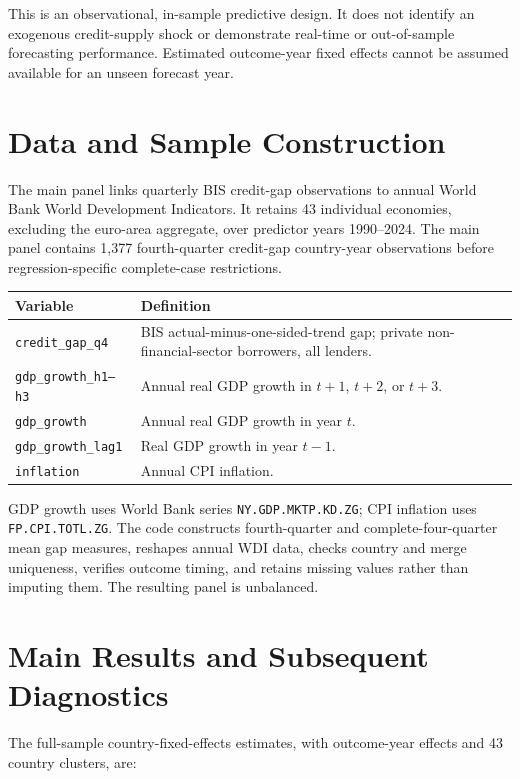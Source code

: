 \documentclass[10pt]{article}
\begin{document}
This is an observational, in-sample predictive design. It does not identify an exogenous credit-supply shock or demonstrate real-time or out-of-sample forecasting performance. Estimated outcome-year fixed effects cannot be assumed available for an unseen forecast year.

\section{Data and Sample Construction}
The main panel links quarterly BIS credit-gap observations to annual World Bank World Development Indicators. It retains 43 individual economies, excluding the euro-area aggregate, over predictor years 1990--2024. The main panel contains 1,377 fourth-quarter credit-gap country-year observations before regression-specific complete-case restrictions.

\begin{center}
\small
\begin{tabularx}{\textwidth}{>{\raggedright\arraybackslash}p{}X}
\toprule
Variable & Definition\\
\midrule
\texttt{credit\_gap\_q4} & BIS actual-minus-one-sided-trend gap; private non-financial-sector borrowers, all lenders.\\
\texttt{gdp\_growth\_h1--h3} & Annual real GDP growth in \(t+1\), \(t+2\), or \(t+3\).\\
\texttt{gdp\_growth} & Annual real GDP growth in year \(t\).\\
\texttt{gdp\_growth\_lag1} & Real GDP growth in year \(t-1\).\\
\texttt{inflation} & Annual CPI inflation.\\
\bottomrule
\end{tabularx}
\end{center}

GDP growth uses World Bank series \texttt{NY.GDP.MKTP.KD.ZG}; CPI inflation uses \texttt{FP.CPI.TOTL.ZG}. The code constructs fourth-quarter and complete-four-quarter mean gap measures, reshapes annual WDI data, checks country and merge uniqueness, verifies outcome timing, and retains missing values rather than imputing them. The resulting panel is unbalanced.

\section{Main Results and Subsequent Diagnostics}
The full-sample country-fixed-effects estimates, with outcome-year effects and 43 country clusters, are:
\end{document}
